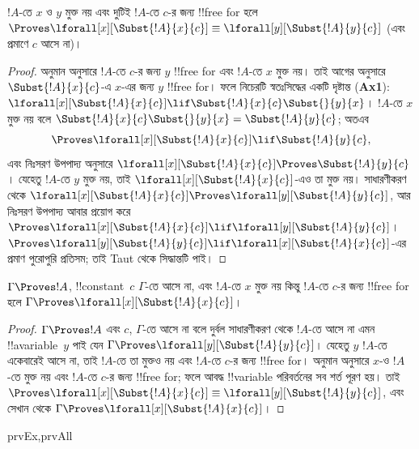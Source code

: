 \documentclass[../../../include/open-logic-section]{subfiles}
\begin{document}
\begin{lem}
$!A$-তে $x$ ও $y$ মুক্ত নয় এবং দুটিই $!A$-তে $c$-র জন্য !!{free for} হলে
$\Proves \lforall[x][\Subst{!A}{x}{c}] \equiv
\lforall[y][\Subst{!A}{y}{c}]$ (এবং প্রমাণে $c$ আসে না)।
\end{lem}

\begin{proof}
অনুমান অনুসারে $!A$-তে $c$-র জন্য $y$ !!{free for} এবং
$!A$-তে $x$ মুক্ত নয়। তাই আগের  অনুসারে
$\Subst{!A}{x}{c}$-এ $x$-এর জন্য $y$ !!{free for}।
ফলে নিচেরটি স্বতঃসিদ্ধের একটি দৃষ্টান্ত (\textbf{Ax1}):
$\lforall[x][\Subst{!A}{x}{c}] \lif \Subst{!A}{x}{c} \Subst{}{y}{x}$।
$!A$-তে $x$ মুক্ত নয় বলে
$\Subst{!A}{x}{c} \Subst{}{y}{x} = \Subst{!A}{y}{c}$; অতএব
\[
\Proves \lforall[x][\Subst{!A}{x}{c}] \lif \Subst{!A}{y}{c},
\]
এবং নিঃসরণ উপপাদ্য অনুসারে $\lforall[x][\Subst{!A}{x}{c}] \Proves
\Subst{!A}{y}{c}$। যেহেতু $!A$-তে $y$ মুক্ত নয়, তাই
$\lforall[x][\Subst{!A}{x}{c}]$-এও তা মুক্ত নয়। সাধারণীকরণ থেকে
$\lforall[x][\Subst{!A}{x}{c}] \Proves \lforall[y][\Subst{!A}{y}{c}]$,
আর নিঃসরণ উপপাদ্য আবার প্রয়োগ করে $\Proves
\lforall[x][\Subst{!A}{x}{c}] \lif \lforall[y][\Subst{!A}{y}{c}]$।
$\Proves \lforall[y][\Subst{!A}{y}{c}] \lif \lforall[x]
[\Subst{!A}{x}{c}]$-এর প্রমাণ পুরোপুরি প্রতিসম; তাই Taut থেকে সিদ্ধান্তটি
পাই।
\end{proof}

\begin{thm}
$\Gamma \Proves !A$, !!{constant}~$c$ $\Gamma$-তে আসে না, এবং
$!A$-তে $x$ মুক্ত নয় কিন্তু $!A$-তে $c$-র জন্য !!{free for} হলে
$\Gamma \Proves \lforall[x][\Subst{!A}{x}{c}]$।
\end{thm}

\begin{proof}
$\Gamma \Proves !A$ এবং $c$, $\Gamma$-তে আসে না বলে দুর্বল
সাধারণীকরণ থেকে $!A$-তে আসে না এমন !!a{variable}~$y$ পাই যেন
$\Gamma \Proves \lforall[y][\Subst{!A}{y}{c}]$। যেহেতু $y$
$!A$-তে একেবারেই আসে না, তাই $!A$-তে তা মুক্তও নয় এবং $!A$-তে $c$-র জন্য
!!{free for}। অনুমান অনুসারে $x$-ও $!A$-তে মুক্ত নয় এবং $!A$-তে $c$-র জন্য
!!{free for}; ফলে আবদ্ধ !!{variable} পরিবর্তনের সব শর্ত পূরণ হয়। তাই
$\Proves \lforall[x][\Subst{!A}{x}{c}] \equiv
\lforall[y][\Subst{!A}{y}{c}]$, এবং সেখান থেকে
$\Gamma \Proves \lforall[x][\Subst{!A}{x}{c}]$।
\end{proof}

\begin{thm}
\begin{tagenumerate}{prvEx,prvAll}
\end{tagenumerate}
\end{thm}
\end{document}

